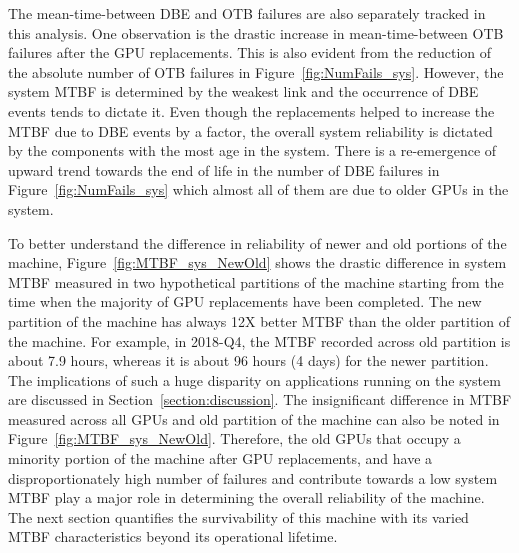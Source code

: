 The mean-time-between DBE and OTB failures are also separately tracked in this analysis.
One observation is the drastic increase in mean-time-between OTB failures after the GPU replacements.
This is also evident from the reduction of the absolute number of OTB failures in Figure~\ref{fig:NumFails_sys}.
However, the system MTBF is determined by the weakest link and the occurrence of DBE events tends to dictate it.
Even though the replacements helped to increase the MTBF due to DBE events by a factor, the overall system 
reliability is dictated by the components with the most age in the system. There is a re-emergence of upward trend towards 
the end of life in the number of DBE failures in Figure~\ref{fig:NumFails_sys} which almost all of them are due to 
older GPUs in the system. 

To better understand the difference in reliability of newer and old portions of the machine, 
Figure~\ref{fig:MTBF_sys_NewOld} shows the drastic difference in system MTBF measured in two hypothetical
partitions of the machine starting from the time when the majority of GPU replacements have been completed. 
The new partition of the machine has always 12X better MTBF than the older partition
of the machine. For example, in 2018-Q4, the MTBF recorded across old partition is about 7.9 hours, whereas it is about
96 hours (4 days) for the newer partition. The implications of such a huge disparity on applications running on the 
system are discussed in Section~\ref{section:discussion}. The insignificant difference in MTBF measured across all GPUs and
old partition of the machine can also be noted in Figure~\ref{fig:MTBF_sys_NewOld}.  
Therefore, the old GPUs that occupy a minority portion of the machine after GPU replacements, 
and have a disproportionately high number of failures and contribute towards a low system MTBF play a major role 
in determining the overall reliability of the machine.
The next section quantifies the survivability of this machine with its varied MTBF characteristics beyond its operational lifetime.

